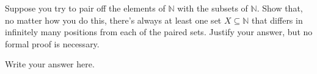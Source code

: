 \documentclass{article}
\renewcommand{\(}{\left(}
\renewcommand{\)}{\right)}
\theoremstyle{plain}
\theoremstyle{plain}
\theoremstyle{definition}
\begin{document}
Suppose you try to pair off the elements of $\mathbb{N}$ with the subsets of $\mathbb{N}$. Show that, no matter how you do this, there's always at least one set $X \subseteq \mathbb{N}$ that differs in infinitely many positions from each of the paired sets. Justify your answer, but no formal proof is necessary.

\begin{shaded}
Write your answer here.
\end{shaded}
\end{document}
